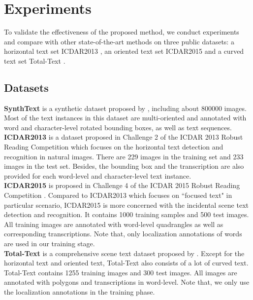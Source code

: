 \documentclass[runningheads]{llncs}
\begin{document}
\section{Experiments}

To validate the effectiveness of the proposed method, we conduct experiments and compare with other state-of-the-art methods on three public datasets: a horizontal text set ICDAR2013 \cite{karatzas2013icdar}, an oriented text set ICDAR2015 \cite{karatzas2015icdar} and a curved text set Total-Text \cite{CK2017}.

\subsection{Datasets}
\textbf{SynthText} is a synthetic dataset proposed by \cite{SynthText}, including about 800000 images. Most of the text instances in this dataset are multi-oriented and annotated  with word and character-level rotated bounding boxes, as well as text sequences.
\\
\textbf{ICDAR2013} is a dataset proposed in Challenge 2 of the ICDAR 2013 Robust Reading Competition \cite{karatzas2013icdar} which focuses on the horizontal text detection and recognition in natural images. There are 229 images in the training set and 233 images in the test set. Besides, the bounding box and the transcription are also provided for each word-level and character-level text instance. 
\\
\textbf{ICDAR2015} is proposed in Challenge 4 of the ICDAR 2015 Robust Reading Competition \cite{karatzas2015icdar}. Compared to ICDAR2013 which focuses on ``focused text" in particular scenario, ICDAR2015 is more concerned with the incidental scene text detection and recognition. It contains 1000 training samples and 500 test images. All training images are annotated with word-level quadrangles as well as corresponding transcriptions. Note that, only localization annotations of words are used in our training stage.
\\
\textbf{Total-Text} is a comprehensive scene text dataset proposed by \cite{CK2017}. Except for the horizontal text and oriented text, Total-Text also consists of a lot of curved text. Total-Text contains 1255 training images and 300 test images. All images are annotated with polygons and transcriptions in word-level. Note that, we only use the localization annotations in the training phase.
\end{document}
